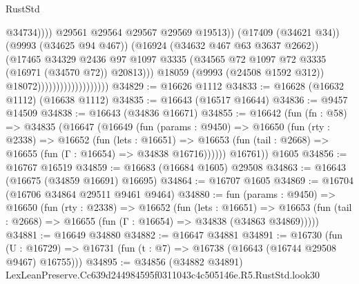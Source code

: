 \begin{lexlean}{RustStd}
\begin{coremodule}
                                                        @34734))))
                                                @29561
                                                @29564
                                                @29567
                                                @29569
                                                @19513))
                                            (@17409 (@34621 @34))
                                            (@9993 (@34625 @94 @467))
                                            (@16924 (@34632 @467 @63 @3637 @2662))
                                            (@17465
                                              @34329
                                              @2436
                                              @97
                                              @1097
                                              @3335
                                              (@34565
                                                @72
                                                @1097
                                                @72
                                                @3335
                                                (@16971 (@34570 @72))
                                                @20813)))
                                          @18059
                                          (@9993 (@24508 @1592 @312))
                                          @18072)))))))))))))))))))
@34829 := @16626 @1112
@34833 := @16628 (@16632 @1112) (@16638 @1112)
@34835 := @16643 (@16517 @16644)
@34836 := @9457 @14509
@34838 := @16643 (@34836 @16671)
@34855 := @16642
    (fun (fn : @58) =>
    @34835
      (@16647
        (@16649
          (fun (params : @9450) =>
          @16650
            (fun (rty : @2338) =>
            @16652
              (fun (lets : @16651) =>
              @16653 (fun (tail : @2668) => @16655 (fun (Γ : @16654) => @34838 @16716))))))
        @16761))
    @1605
@34856 := @16767 @16519
@34859 := @16683 (@16684 @1605) @29508
@34863 := @16643 (@16675 (@34859 @16691) @16695)
@34864 := @16707 @1605
@34869 := @16704 (@16706 @34864 @29511 @9461 @9464)
@34880 := fun (params : @9450) =>
  @16650
    (fun (rty : @2338) =>
    @16652
      (fun (lets : @16651) =>
      @16653 (fun (tail : @2668) => @16655 (fun (Γ : @16654) => @34838 (@34863 @34869)))))
@34881 := @16649 @34880
@34882 := @16647 @34881
@34891 := @16730
    (fun (U : @16729) => @16731 (fun (t : @7) => @16738 (@16643 (@16744 @29508 @9467) @16755)))
@34895 := @34856 (@34882 @34891) LexLeanPreserve.Cc639d244984595f0311043c4c505146e.R5.RustStd.look30

\end{coremodule}
\end{lexlean}

